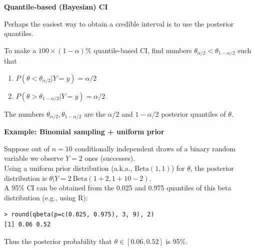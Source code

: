 \documentclass[12pt,xcolor=svgnames]{beamer}
\newcommand{\bl}{\color{blue}}
\newcommand{\theme}{\color{FireBrick}}
\newcommand{\mr}[1]{\mathrm{#1}}
\newcommand{\sk}{\vspace{.4cm}}
\newcommand{\chap}[1]{{\theme \Large \bf #1} \sk}
\begin{document}
\begin{frame}
\chap{Quantile-based (Bayesian) CI}

Perhaps the easiest way to obtain a credible interval is to use the posterior quantiles.

To make a $100 \times (1-\alpha)$\% quantile-based CI, find numbers $\theta_{\alpha/2}<\theta_{1- \alpha/2}$ such that
\begin{enumerate}
\item $P(\theta <\theta_{\alpha/2} |Y=y)=\alpha/2$
\item $P(\theta >\theta_{1-\alpha/2} |Y=y)=\alpha/2$
\end{enumerate}
The numbers $\theta_{\alpha/2},\theta_{1- \alpha/2}$ are the $\alpha/2$ and  $1-\alpha/2$ posterior quantiles of $\theta$.\\

\end{frame}


\begin{frame}[fragile]
\chap{Example: Binomial sampling + uniform prior}

Suppose out of $n=10$ conditionally independent draws of a binary random variable we observe $Y=2$ ones (successes). \\

\sk
Using a uniform prior distribution (a.k.a., $\mr{Beta}(1,1)$) for $\theta$, the posterior distribution is $\theta | Y=2 ~ \mr{Beta}(1+2,1+10-2)$. \\

\sk
A 95\% CI can be obtained from the 0.025 and 0.975 quantiles of this beta distribution (e.g., using {\sf R}):\\
{\bl \footnotesize
\begin{verbatim}
> round(qbeta(p=c(0.025, 0.975), 3, 9), 2)
[1] 0.06 0.52
\end{verbatim}
}
Thus the posterior probability that $\theta \in [0.06, 0.52]$ is 95\%. 
\end{frame}
\end{document}
